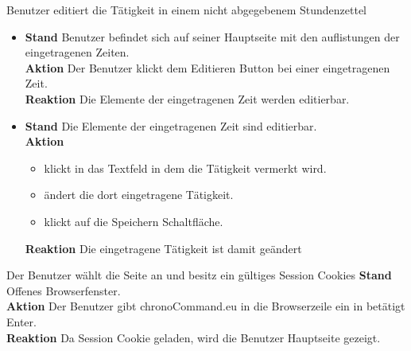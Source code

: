 \begin{requirements}
	 Benutzer editiert die Tätigkeit in einem nicht abgegebenem Stundenzettel
	\begin{itemize}
	    \item
	        \textbf{Stand} Benutzer befindet sich auf seiner Hauptseite mit den auflistungen der eingetragenen Zeiten. \\
	        \textbf{Aktion} Der Benutzer klickt dem Editieren Button bei einer eingetragenen Zeit.\\
            \textbf{Reaktion} Die Elemente der eingetragenen Zeit werden editierbar.
        \item
        \textbf{Stand} Die Elemente der eingetragenen Zeit sind editierbar.\\
        \textbf{Aktion}
            \begin{itemize} Der Benutzer
                \item klickt in das Textfeld in dem die Tätigkeit vermerkt wird.
                \item ändert die dort eingetragene Tätigkeit.
                \item klickt auf die Speichern Schaltfläche.
            \end{itemize}
            \textbf{Reaktion} Die eingetragene Tätigkeit ist damit geändert
    \end{itemize}

     Der Benutzer wählt die Seite an und besitz ein gültiges Session Cookies
        \textbf{Stand} Offenes Browserfenster. \\
        \textbf{Aktion} Der Benutzer gibt chronoCommand.eu in die Browserzeile ein in betätigt Enter. \\
        \textbf{Reaktion} Da Session Cookie geladen, wird die Benutzer Hauptseite gezeigt.

\end{requirements}
